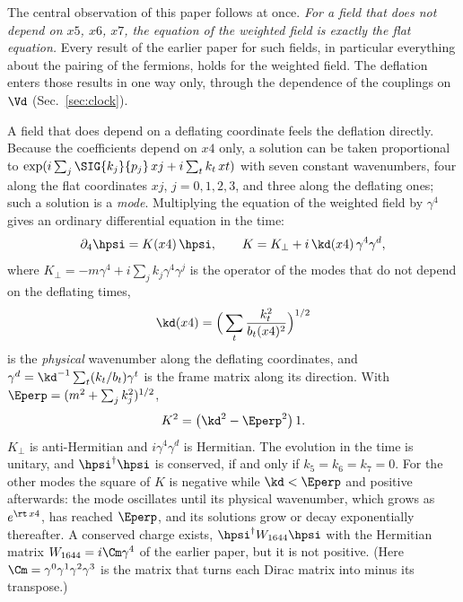 The central observation of this paper follows at once. \emph{For a field that does not depend on
$x5$, $x6$, $x7$, the equation of the weighted field is exactly the flat equation.} Every result of
the earlier paper for such fields, in particular everything about the pairing of the fermions, holds
for the weighted field. The deflation enters those results in one way only, through the dependence of
the couplings on $\Vd$ (Sec.~\ref{sec:clock}).

A field that does depend on a deflating coordinate feels the deflation directly. Because the
coefficients depend on $x4$ only, a solution can be taken proportional to
$\exp(i\sum_j\SIG{k_j}{p_j}\,xj+i\sum_tk_t\,xt)$ with seven constant wavenumbers, four along the flat
coordinates $xj$, $j=0,1,2,3$, and three along the deflating ones; such a solution is a \emph{mode}. Multiplying the equation of the weighted field by $\gamma^{4}$ gives an ordinary
differential equation in the time:
\begin{equation}
\partial_4\hpsi=K(x4)\,\hpsi,\qquad K=K_\perp+i\,\kd(x4)\,\gamma^{4}\gamma^{d},
\label{eq:K}
\end{equation}
where $K_\perp=-m\gamma^{4}+i\sum_jk_j\gamma^{4}\gamma^{j}$ is the operator of the modes that do not
depend on the deflating times,
\begin{equation}
\kd(x4)=\Big(\sum_t\frac{k_t^{2}}{b_t(x4)^{2}}\Big)^{1/2}
\label{eq:kd}
\end{equation}
is the \emph{physical} wavenumber along the deflating coordinates, and
$\gamma^{d}=\kd^{-1}\sum_t(k_t/b_t)\gamma^{t}$ is the frame matrix along its direction. With
$\Eperp=(m^{2}+\sum_jk_j^{2})^{1/2}$,
\begin{equation}
K^{2}=\big(\kd^{2}-\Eperp^{2}\big)\,1 .
\label{eq:K2}
\end{equation}
$K_\perp$ is anti-Hermitian and $i\gamma^{4}\gamma^{d}$ is Hermitian. The evolution in the time is
unitary, and $\hpsi^\dagger\hpsi$ is conserved, if and only if $k_5=k_6=k_7=0$. For the other modes
the square of $K$ is negative while $\kd<\Eperp$ and positive afterwards: the mode oscillates until
its physical wavenumber, which grows as $e^{\rt\,x4}$, has reached $\Eperp$, and its solutions grow
or decay exponentially thereafter. A conserved charge exists, $\hpsi^\dagger W_{1644}\hpsi$ with the
Hermitian matrix $W_{1644}=i\Cm\gamma^{4}$ of the earlier paper, but it is not positive. (Here
$\Cm=\gamma^{0}\gamma^{1}\gamma^{2}\gamma^{3}$ is the matrix that turns each Dirac matrix into minus its
transpose.)
